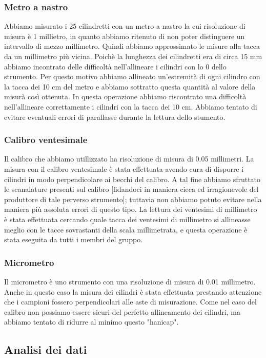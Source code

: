 \documentclass[12pt, twoside, a4paper]{article}
\begin{document}
\subsubsection{Metro a nastro}
Abbiamo misurato i 25 cilindretti con un metro a nastro la cui risoluzione di misura è 1 millietro, in quanto abbiamo ritenuto di non poter distinguere un intervallo di mezzo millimetro. Quindi abbiamo approssimato le misure alla tacca da un millimetro più vicina. Poichè la lunghezza dei cilindretti era di circa 15 mm abbiamo incontrato delle difficoltà nell'allineare i cilindri con lo 0 dello strumento. Per questo motivo abbiamo allineato un'estremità di ogni cilindro con la tacca dei 10 cm del metro e abbiamo sottratto questa quantità al valore della misurà così ottenuta. In questa operazione abbiamo riscontrato una difficoltà nell'allineare correttamente i cilindri con la tacca dei 10 cm. Abbiamo tentato di evitare eventuali errori di parallasse durante la lettura dello stumento. 

\subsubsection{Calibro ventesimale}
Il calibro che abbiamo utillizzato ha risoluzione di misura di 0.05 millimetri. La misura con il calibro ventesimale è stata effettuata avendo cura di disporre i cilindri in modo perpendicolare ai becchi del calibro. A tal fine abbiamo sfruttato le scanalature presenti sul calibro [fidandoci in maniera cieca ed irragionevole del produttore di tale perverso strumento]; tuttavia non abbiamo potuto evitare nella maniera più assoluta errori di questo tipo.
La lettura dei ventesimi di millimetro è stata effettuata cercando quale tacca dei ventesimi di millimetro si allineasse meglio con le tacce sovrastanti della scala millimetrata, e questa operazione è stata eseguita da tutti i membri del gruppo.

\subsubsection{Micrometro}
Il micrometro è uno strumento con una risoluzione di misura di 0.01 millimetro. Anche in questo caso la misura dei cilindri è stata effettuata prestando attenzione che i campioni fossero perpendicolari alle aste di misurazione. Come nel caso del calibro non possiamo essere sicuri del perfetto allineamento dei cilindri, ma abbiamo tentato di ridurre al minimo questo "hanicap".

\subsection{Analisi dei dati}
\end{document}
